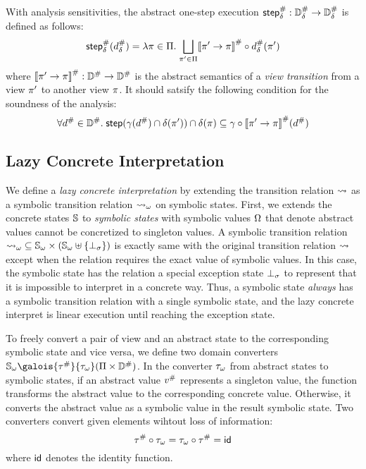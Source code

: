 With analysis sensitivities, the abstract one-step execution ${\textsf{step}}^{\#}_\delta:
{\mathbb{D}}^{\#}_\delta \rightarrow {\mathbb{D}}^{\#}_\delta$ is defined as follows:
\[
  {\textsf{step}}^{\#}_\delta({d}^{\#}_\delta) = \lambda \pi \in \Pi. \; \underset{\pi' \in
  \Pi}{\bigsqcup}{{[\![{\pi' \rightarrow \pi}]\!]}^{\#} \circ {d}^{\#}_\delta(\pi')}
\]
where ${[\![{\pi' \rightarrow \pi}]\!]}^{\#}: {\mathbb{D}}^{\#} \rightarrow {\mathbb{D}}^{\#}$ is the abstract
semantics of a \textit{view transition} from a view $\pi'$ to another view
$\pi$.  It should satsify the following condition for the soundness of the
analysis:
\[
  \forall {d}^{\#} \in {\mathbb{D}}^{\#}. \; \textsf{step}(\gamma({d}^{\#}) \cap \delta(\pi'))
  \cap \delta(\pi) \subseteq \gamma \circ
  {[\![{\pi' \rightarrow \pi}]\!]}^{\#}({d}^{\#})
\]



\subsection{Lazy Concrete Interpretation}

We define a \textit{lazy concrete interpretation} by extending the transition
relation $\leadsto$ as a symbolic transition relation ${\leadsto}_\omega$ on symbolic
states. First, we extends the concrete states $\mathbb{S}$ to \textit{symbolic
states} with symbolic values $\Omega$ that denote abstract values cannot be
concretized to singleton values. A symbolic transition relation ${\leadsto}_\omega
\subseteq {\mathbb{S}}_\omega \times ({\mathbb{S}}_\omega \uplus \{ \bot_\sigma \})$ is exactly same
with the original transition relation $\leadsto$ except when the relation requires
the exact value of symbolic values.  In this case, the symbolic state has the
relation a special exception state $\bot_\sigma$ to represent that it is impossible
to interpret in a concrete way.  Thus, a symbolic state \textit{always} has a
symbolic transition relation with a single symbolic state, and the lazy concrete
interpret is linear execution until reaching the exception state.

To freely convert a pair of view and an abstract state to the corresponding
symbolic state and vice versa, we define two domain converters $\symbstset
\galois{\saconverter}{\asconverter} (\viewset \times \absdom)$.  In the
converter ${\tau}_\omega$ from abstract states to symbolic states, if an abstract
value ${v}^{\#}$ represents a singleton value, the function transforms the
abstract value to the corresponding concrete value.  Otherwise, it converts the
abstract value as a symbolic value in the result symbolic state.  Two converters
convert given elements wihtout loss of information:
\[
  {\tau}^{\#} \circ {\tau}_\omega = {\tau}_\omega \circ {\tau}^{\#} = \textsf{id}
\]
where $\textsf{id}$ denotes the identity function.



